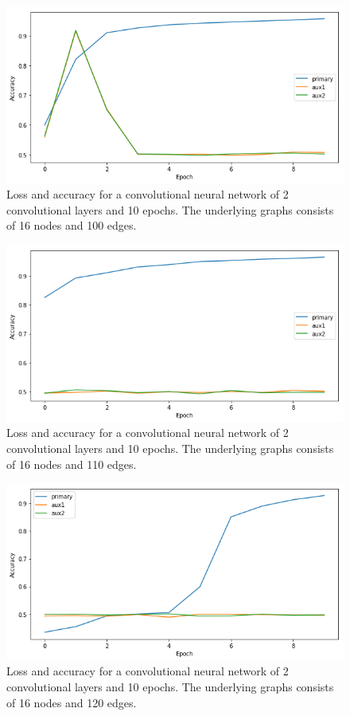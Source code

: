 \documentclass[letterpaper,UKenglish]{lipics-v2018}
\begin{document}
\begin{figure}
\centering
  \includegraphics[scale = .5]{pic/100-edges-conv.png}
\caption{Loss and accuracy for a convolutional neural network of 2 convolutional layers and 10 epochs. The underlying graphs consists of 16 nodes and 100 edges.}
\end{figure}

\begin{figure}
\centering
  \includegraphics[scale = .5]{pic/110-edges-conv.png}
\caption{Loss and accuracy for a convolutional neural network of 2 convolutional layers and 10 epochs. The underlying graphs consists of 16 nodes and 110 edges.}
\end{figure}

\begin{figure}
\centering
  \includegraphics[scale = .5]{pic/120-edges-conv.png}
\caption{Loss and accuracy for a convolutional neural network of 2 convolutional layers and 10 epochs. The underlying graphs consists of 16 nodes and 120 edges.}
\end{figure}


\end{document}
